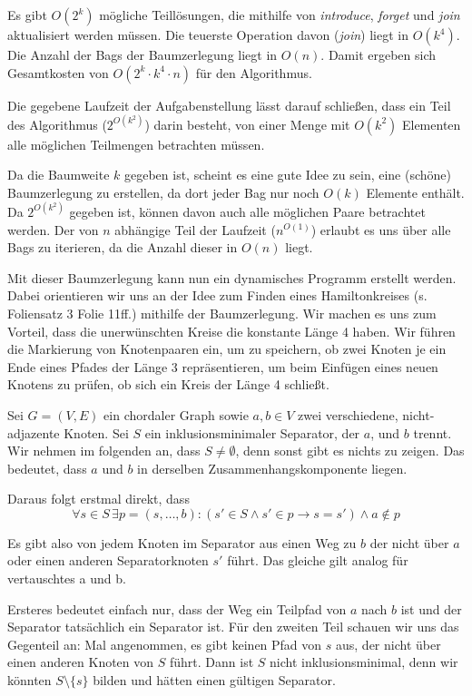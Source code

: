 Es gibt $O(2^k)$ mögliche Teillösungen, die mithilfe von \textit{introduce}, \textit{forget} und \textit{join} aktualisiert werden müssen. Die teuerste Operation davon (\textit{join}) liegt in $O(k^4)$. Die Anzahl der Bags der Baumzerlegung liegt in $O(n)$. Damit ergeben sich Gesamtkosten von $O(2^k\cdot k^4\cdot n)$ für den Algorithmus.

\how

Die gegebene Laufzeit der Aufgabenstellung lässt darauf schließen, dass ein Teil des Algorithmus ($2^{O(k^2)}$) darin besteht, von einer Menge mit $O(k^2)$ Elementen alle möglichen Teilmengen betrachten müssen.

Da die Baumweite $k$ gegeben ist, scheint es eine gute Idee zu sein, eine (schöne) Baumzerlegung zu erstellen, da dort jeder Bag nur noch $O(k)$ Elemente enthält. Da $2^{O(k^2)}$ gegeben ist, können davon auch alle möglichen Paare betrachtet werden. Der von $n$ abhängige Teil der Laufzeit ($n^{O(1)}$) erlaubt es uns über alle Bags zu iterieren, da die Anzahl dieser in $O(n)$ liegt.

Mit dieser Baumzerlegung kann nun ein dynamisches Programm erstellt werden. Dabei orientieren wir uns an der Idee zum Finden eines Hamiltonkreises (s. Foliensatz 3 Folie 11ff.) mithilfe der Baumzerlegung. Wir machen es uns zum Vorteil, dass die unerwünschten Kreise die konstante Länge 4 haben. Wir führen die Markierung von Knotenpaaren ein, um zu speichern, ob zwei Knoten je ein Ende eines Pfades der Länge 3 repräsentieren, um beim Einfügen eines neuen Knotens zu prüfen, ob sich ein Kreis der Länge 4 schließt.


\subexercise
\label{sec:sep-clique}

Sei $G = (V,E)$ ein chordaler Graph sowie $a,b \in V$ zwei verschiedene, nicht-adjazente Knoten. Sei $S$ ein inklusionsminimaler Separator, der $a$, und $b$ trennt.
Wir nehmen im folgenden an, dass $S \neq \emptyset$, denn sonst gibt es nichts zu zeigen. Das bedeutet, dass $a$ und $b$ in derselben Zusammenhangskomponente liegen.

Daraus folgt erstmal direkt, dass $$\forall s \in S \, \exists p = (s, \dots, b) \colon (s' \in S \wedge s' \in p \rightarrow s = s') \wedge a \notin p$$

Es gibt also von jedem Knoten im Separator aus einen Weg zu $b$ der nicht über $a$ oder einen anderen Separatorknoten $s'$ führt.
Das gleiche gilt analog für vertauschtes a und b.

Ersteres bedeutet einfach nur, dass der Weg ein Teilpfad von $a$ nach $b$ ist und der Separator tatsächlich ein Separator ist. Für den zweiten Teil schauen wir uns das Gegenteil an:
Mal angenommen, es gibt keinen Pfad von $s$ aus, der nicht über einen anderen Knoten von $S$ führt. Dann ist $S$ nicht inklusionsminimal, denn wir könnten $S \setminus \{s\}$ bilden und hätten einen gültigen Separator.

